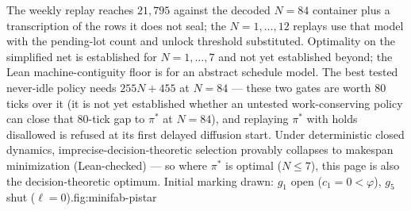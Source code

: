 \begin{landscape}
\begin{minipage}{0.94\linewidth}
{The weekly replay reaches $21{,}795$ against the decoded
$N=84$ container plus a transcription of the rows it does not
seal; the $N=1,\dots,12$ replays use that model with the
pending-lot count and unlock threshold substituted. Optimality
on the simplified net is established for $N=1,\dots,7$
and not yet established beyond; the
Lean machine-contiguity floor is for an abstract schedule model. The best tested never-idle policy needs
$255N + 455$ at $N = 84$ --- these two gates are worth $80$ ticks over it
(it is not yet established whether an untested work-conserving policy
can close that $80$-tick gap to $\pi^{\ast}$ at $N=84$), and replaying $\pi^{\ast}$ with
holds disallowed is refused at its first delayed diffusion start.
Under deterministic closed dynamics, imprecise-decision-theoretic
selection provably collapses to makespan minimization (Lean-checked)
--- so where $\pi^{\ast}$ is optimal ($N \le 7$), this page is also
the decision-theoretic optimum. Initial
marking drawn: $g_1$ open ($c_1 = 0 < \varphi$), $g_5$ shut
($\ell = 0$).}{fig:minifab-pistar}
\end{minipage}
\par
\vspace*{\fill}
\thispagestyle{empty}
\end{landscape}
\restoregeometry
